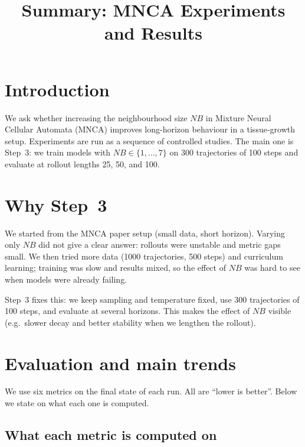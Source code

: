 \documentclass[11pt,a4paper]{article}
\title{Summary: MNCA Experiments and Results}
\author{}
\date{}
\begin{document}
\maketitle
\tableofcontents
\newpage

\section{Introduction}

We ask whether increasing the neighbourhood size \(NB\) in Mixture Neural Cellular Automata (MNCA) improves long-horizon behaviour in a tissue-growth setup. Experiments are run as a sequence of controlled studies. The main one is Step~3: we train models with \(NB \in \{1,\dots,7\}\) on 300 trajectories of 100 steps and evaluate at rollout lengths 25, 50, and 100.

\section{Why Step~3}

We started from the MNCA paper setup (small data, short horizon). Varying only \(NB\) did not give a clear answer: rollouts were unstable and metric gaps small. We then tried more data (1000 trajectories, 500 steps) and curriculum learning; training was slow and results mixed, so the effect of \(NB\) was hard to see when models were already failing.

Step~3 fixes this: we keep sampling and temperature fixed, use 300 trajectories of 100 steps, and evaluate at several horizons. This makes the effect of \(NB\) visible (e.g.\ slower decay and better stability when we lengthen the rollout).

\section{Evaluation and main trends}

We use six metrics on the final state of each run. All are ``lower is better''. Below we state on what each one is computed.

\subsection{What each metric is computed on}
\label{sec:metrics-def}
\end{document}
